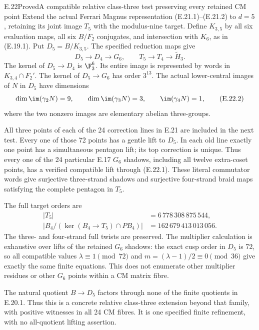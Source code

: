 \begin{statement}{E.22}{Proved}{A compatible relative class-three test preserving every retained CM point}
Extend the actual Ferrari Magnus representation
(E.21.1)--(E.21.2) to $d=5$, retaining its joint
image $T_5$ with the modulus-nine target. Define
$K_{3,5}$ by all six evaluation maps, all six
$B/F_2$ conjugates, and intersection with $K_6$,
as in (E.19.1). Put $D_5=B/K_{3,5}$. The
specified reduction maps give
\[
 D_5\longrightarrow D_4\longrightarrow G_6,
 \qquad
 T_5\longrightarrow T_4\longrightarrow\widetilde H_3.
 \tag{E.22.1}
\]
The kernel of $D_5\to D_4$ is $\F_3^6$.
Its entire image is represented by words in
$K_{3,4}\cap F_2'$. The kernel of $D_5\to G_6$
has order $3^{13}$. The actual lower-central
images of $N$ in $D_5$ have dimensions
\[
 \dim\im(\gamma_2N)=9,\qquad
 \dim\im(\gamma_3N)=3,\qquad
 \im(\gamma_4N)=1,
 \tag{E.22.2}
\]
where the two nonzero images are elementary
abelian three-groups.

All three points of each of the 24 correction
lines in E.21 are included in the next test.
Every one of those 72 points has a gentle lift
to $D_5$. In each old line exactly one point
has a simultaneous pentagon lift; its top
correction is unique. Thus every one of the
24 particular E.17 $G_6$ shadows, including
all twelve extra-coset points, has a verified
compatible lift through (E.22.1). These
literal commutator words give surjective
three-strand shadows and surjective
four-strand braid maps satisfying the
complete pentagon in $T_5$.

The full target orders are
\[
 \begin{aligned}
 |T_5|&=6\,778\,308\,875\,544,\\
 |B_4/(\ker(B_4\to T_5)\cap PB_4)|
       &=162\,679\,413\,013\,056.
 \end{aligned}
 \tag{E.22.3}
\]
The three- and four-strand full twists
are preserved. The multiplier calculation
is exhaustive over lifts of the retained
$G_6$ shadows: the exact cusp order in
$D_5$ is 72, so all compatible values
$\lambda\equiv1\pmod{72}$ and
$m=(\lambda-1)/2\equiv0\pmod{36}$
give exactly the same finite equations.
This does not enumerate other multiplier
residues or other $G_6$ points within a
CM matrix fibre.

The natural quotient $B\to D_5$ factors
through none of the finite quotients in
E.20.1. Thus this is a concrete relative
class-three extension beyond that family,
with positive witnesses in all 24 CM
fibres. It is one specified finite
refinement, with no all-quotient
lifting assertion.
\end{statement}
